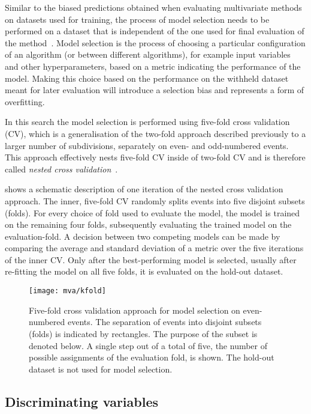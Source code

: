 Similar to the biased predictions obtained when evaluating
multivariate methods on datasets used for training, the process of
model selection needs to be performed on a dataset that is independent
of the one used for final evaluation of the
method~\cite{cawley10}. Model selection is the process of choosing a
particular configuration of an algorithm (or between different
algorithms), for example input variables and other hyperparameters,
based on a metric indicating the performance of the model. Making this
choice based on the performance on the withheld dataset meant for
later evaluation will introduce a selection bias and represents a form
of overfitting.

In this search the model selection is performed using five-fold cross
validation (CV), which is a generalisation of the two-fold approach
described previously to a larger number of subdivisions, separately on
even- and odd-numbered events. This approach effectively nests
five-fold CV inside of two-fold CV and is therefore called
\emph{nested cross validation}~\cite{cawley10,stone74}.

 shows a schematic description of one
iteration of the nested cross validation approach. The inner,
five-fold CV randomly splits events into five disjoint subsets
(folds). For every choice of fold used to evaluate the model, the
model is trained on the remaining four folds, subsequently evaluating
the trained model on the evaluation-fold. A decision between two
competing models can be made by comparing the average and standard
deviation of a metric over the five iterations of the inner CV. Only
after the best-performing model is selected, usually after re-fitting
the model on all five folds, it is evaluated on the hold-out dataset.

\begin{figure}[htbp]
  \centering

  \texttt{[image: mva/kfold]}

  \caption{Five-fold cross validation approach for model selection on
    even-numbered events. The separation of events into disjoint
    subsets (folds) is indicated by rectangles. The purpose of the
    subset is denoted below. A single step out of a total of five, the
    number of possible assignments of the evaluation fold, is
    shown. The hold-out dataset is not used for model selection.}
  \label{fig:cross_validation}
\end{figure}


\subsection{Discriminating variables}
\label{sec:mva_discriminating variables}

